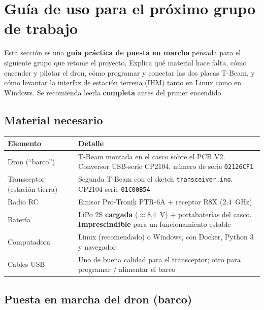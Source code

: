 \documentclass[12pt,a4paper]{article}
\newcommand{\file}[1]{\texttt{#1}}
\begin{document}
\section{Gu\'ia de uso para el pr\'oximo grupo de trabajo}
\label{sec:guia}

Esta secci\'on es una \textbf{gu\'ia pr\'actica de puesta en marcha} pensada para
el siguiente grupo que retome el proyecto. Explica qu\'e material hace falta, c\'omo
encender y pilotar el dron, c\'omo programar y conectar las dos placas T-Beam, y
c\'omo levantar la interfaz de estaci\'on terrena (IHM) tanto en Linux como en
Windows. Se recomienda leerla \textbf{completa} antes del primer encendido.

\subsection{Material necesario}

\begin{longtable}{L{4.5cm} L{8.5cm}}
  \toprule
  \textcolor{tableheadfg}{\textbf{Elemento}} &
  \textcolor{tableheadfg}{\textbf{Detalle}} \\
  \midrule
  \endhead
  \bottomrule
  \endfoot
  Dron (``barco'') & T-Beam montada en el casco sobre el PCB V2. Conversor
                     USB-serie CP2104, n\'umero de serie \texttt{02126CF1} \\[3pt]
  Transceptor (estaci\'on tierra) & Segunda T-Beam con el sketch
                     \file{transceiver.ino}. CP2104 serie \texttt{01C00B54} \\[3pt]
  Radio RC & Emisor Pro-Tronik PTR-6A + receptor R8X (2,4~GHz) \\[3pt]
  Bater\'ia & LiPo 2S \textbf{cargada} ($\approx$8,4~V) + portabater\'ias del
              casco. \textbf{Imprescindible} para un funcionamiento estable \\[3pt]
  Computadora & Linux (recomendado) o Windows, con Docker, Python 3 y navegador \\[3pt]
  Cables USB & Uno de buena calidad para el transceptor; otro para programar /
               alimentar el barco \\
\end{longtable}

\subsection{Puesta en marcha del dron (barco)}
\end{document}
